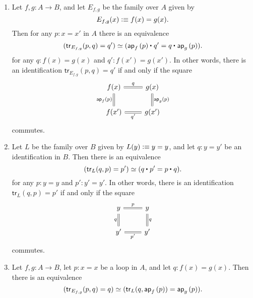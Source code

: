 \begin{samepage}%
\begin{lem}\label{lem:circle_up_tr_compute} ~
\begin{enumerate}
\item Let $f,g:A \to B$, and let $E_{f,g}$ be the family over $A$ given by 
\begin{equation*}
E_{f,g}(x)\vcentcolon\equiv f(x)=g(x).
\end{equation*}
Then for any $p:x=x'$ in $A$ there is an equivalence
\begin{equation*}
\eqv{(\mathsf{tr}_{E_{f,g}}(p,q)=q')}{(\ct{\ap{f}{p}}{q'}=\ct{q}{\ap{g}{p}})}.
\end{equation*}
for any $q:f(x)=g(x)$ and $q':f(x')=g(x')$. In other words, there is an identification $\mathsf{tr}_{E_{f,g}}(p,q)=q'$ if and only if the square
\begin{equation*}
\begin{tikzcd}
f(x) \arrow[r,equals,"q"] \arrow[d,equals,swap,"\ap{f}{p}"] & g(x) \arrow[d,equals,"\ap{g}{p}"] \\
f(x') \arrow[r,equals,swap,"{q'}"] & g(x') 
\end{tikzcd}
\end{equation*}
commutes.
\item Let $L$ be the family over $B$ given by $L(y)\vcentcolon\equiv y=y$, and let $q:y=y'$ be an identification in $B$. Then there is an equivalence
\begin{equation*}
\eqv{(\mathsf{tr}_L(q,p)=p')}{(\ct{q}{p'}=\ct{p}{q})}. 
\end{equation*}
for any $p:y=y$ and $p':y'=y'$. In other words, there is an identification $\mathsf{tr}_L(q,p)=p'$ if and only if the square
\begin{equation*}
\begin{tikzcd}
y \arrow[r,equals,"p"] \arrow[d,swap,equals,"q"] & y \arrow[d,equals,"q"] \\
y' \arrow[r,equals,swap,"{p'}"] & y'
\end{tikzcd}
\end{equation*}
commutes.
\item Let $f,g:A \to B$, let $p:x=x$ be a loop in $A$, and let $q:f(x)=g(x)$. Then there is an equivalence
\begin{equation*}
\eqv{(\mathsf{tr}_{E_{f,g}}(p,q)=q)}{(\mathsf{tr}_L(q,\ap{f}{p})=\ap{g}{p}).}
\end{equation*}
\end{enumerate}
\end{lem}
\end{samepage}%

